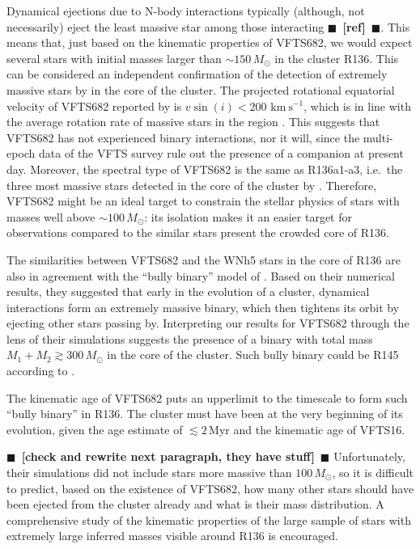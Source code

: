 \documentclass{aa}
\newcommand{\todo}[1]{{\large $\blacksquare$~\textbf{\color{red}[#1]}}~$\blacksquare$}
\newcommand{\kms}{{\,\mathrm{km\ s^{-1}}}}
\begin{document}
Dynamical ejections due to N-body interactions typically (although, not necessarily) eject the least
massive star among those interacting \todo{ref}. This means that, just
based on the kinematic properties of VFTS682, we would expect several
stars with initial masses larger than $\sim$$150\,M_\odot$ in the
cluster R136.
This can be considered an independent confirmation of the detection
of extremely massive stars by \cite{crowther:10} in the core of the
cluster. The projected rotational equatorial velocity of VFTS682
reported by \cite{schneider:18} is $v\sin(i)<200\,\kms$, which is in
line with the average rotation rate of massive stars in the region
\citep[][]{ramirez-agudelo:15}. This suggests that VFTS682 has not
experienced binary interactions, nor it will, since the multi-epoch
data of the VFTS survey rule out the presence of a companion at
present day. Moreover, the spectral type of VFTS682
\citep[WNh5,][]{bestenlehner:11} is the same as R136a1-a3, i.e.~the
three most massive stars detected in the core of the cluster by
\cite{crowther:10}. Therefore,
VFTS682 might be an ideal target to constrain the stellar physics of
stars with masses well above $\sim100\,M_\odot$: its isolation makes
it an easier target for observations compared to the similar stars present the crowded core of R136.

The similarities between VFTS682 and the WNh5 stars in the core of
R136 are also in agreement with the ``bully binary'' model of
\cite{fujii:11}. Based on their numerical results, they suggested that
early in the evolution of a cluster, dynamical interactions form an extremely
massive binary, which then tightens its orbit by ejecting other stars passing
by. Interpreting our results for VFTS682 through the lens of their simulations
suggests the presence of a binary with total mass
$M_1+M_2\gtrsim 300\,M_\odot$ in the core of the cluster. Such bully
binary could be R145 according to \cite{fujii:11}.

The kinematic age of VFTS682 puts an
upperlimit to the timescale to form such ``bully binary'' in
R136. The cluster must have been at the very beginning of its
evolution, given the age estimate of $\lesssim 2$\,Myr
\cite{crowther:10,sabbi:12} and the kinematic age of VFTS16.

\todo{check \cite{banerjee} and rewrite next paragraph, they
  have stuff} Unfortunately, their simulations did not include stars more
massive than $100\,M_\odot$, so it is difficult to predict, based on
the existence of VFTS682, how many other stars should have been
ejected from the cluster already and what is their mass
distribution. A comprehensive study of the kinematic properties of the
large sample of stars with extremely large inferred masses visible
around R136 is encouraged.  
\end{document}
